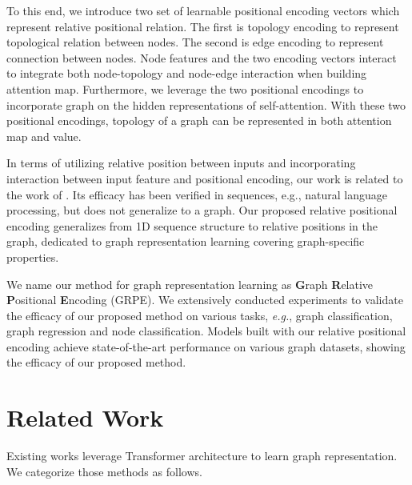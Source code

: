 \documentclass[letterpaper]{article} \usepackage{aaai23}  \usepackage{times}  \usepackage{helvet}  \usepackage{courier}  \usepackage[hyphens]{url}  \usepackage{graphicx} \urlstyle{rm} \def\UrlFont{\rm}  \usepackage{natbib}  \usepackage{caption} \frenchspacing  \setlength{\pdfpagewidth}{8.5in} \setlength{\pdfpageheight}{11in} \usepackage{algorithm}
\newcommand{\eg}{\textit{e.g.}}
\begin{document}
To this end, we introduce two set of learnable positional encoding vectors which represent relative positional relation.
The first is topology encoding to represent topological relation between nodes.
The second is edge encoding to represent connection between nodes.
Node features and the two encoding vectors interact to integrate both node-topology and node-edge interaction when building attention map.
Furthermore, we leverage the two positional encodings to incorporate graph on the hidden representations of self-attention.
With these two positional encodings, topology of a graph can be represented in both attention map and value.




In terms of utilizing relative position between inputs and incorporating interaction between input feature and positional encoding, our work is related to the work of \citeauthor{shaw2018self}.
Its efficacy has been verified in sequences, e.g., natural language processing, but does not generalize to  a graph. 
Our proposed relative positional encoding generalizes from 1D sequence structure to relative positions in the graph,
 dedicated to graph representation learning covering graph-specific properties.














We name our method for graph representation learning as \textbf{G}raph \textbf{R}elative \textbf{P}ositional \textbf{E}ncoding (GRPE).
We extensively conducted experiments to validate the efficacy of our proposed method on various tasks, \eg, graph classification, graph regression and node classification.
Models built with our relative positional encoding achieve state-of-the-art performance on various graph datasets, showing the efficacy of our proposed method.


 \section{Related Work}
\label{sec:related_work}










Existing works leverage Transformer architecture to learn graph representation. We categorize those methods as follows.
\end{document}
